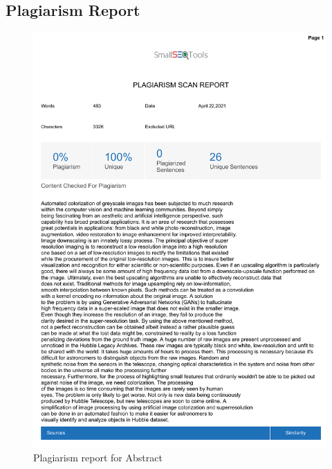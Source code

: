 \documentclass[oneside,a4paper,12pt]{report}
\begin{document}
\begin{appendices}

\chapter{Plagiarism Report }


\begin{figure}
	\centering
    \includegraphics[scale=0.7]{plagiarism/abstract.pdf}
    \caption{Plagiarism report for Abstract}
    \label{PlagiarismAbstract}
\end{figure}


\end{appendices}
\end{document}
